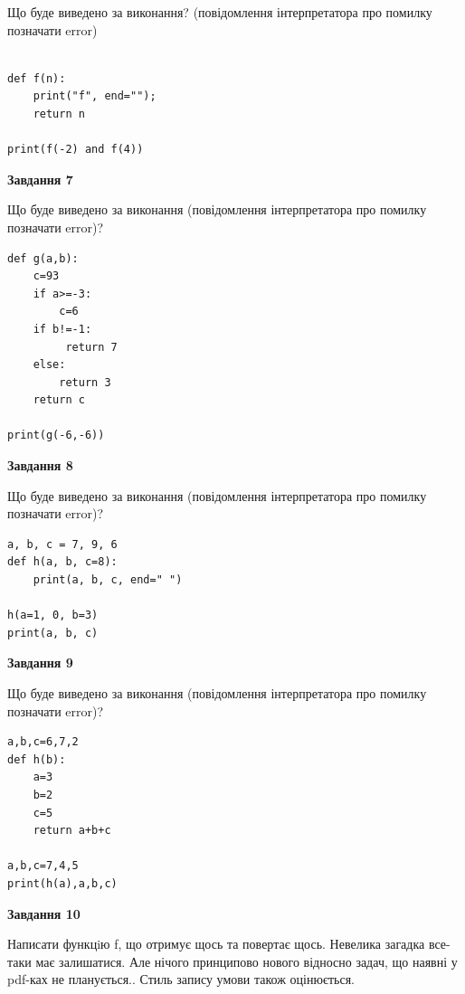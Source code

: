 \documentclass[12pt, ukrainian]{article}
\begin{document}
{\begin {large}
Що буде виведено за виконання? (повідомлення інтерпретатора про помилку позначати error)\par
\begin{verbatim}

def f(n):
    print("f", end="");
    return n

print(f(-2) and f(4))
\end{verbatim}

{\begin {center}\textbf{Завдання 7}\end {center}}

Що буде виведено за виконання (повідомлення інтерпретатора про помилку позначати error)?\par
\begin{verbatim}
def g(a,b):
    c=93
    if a>=-3:
        c=6
    if b!=-1:
         return 7
    else: 
        return 3
    return c

print(g(-6,-6))
\end{verbatim}

{\begin {center}\textbf{Завдання 8}\end {center}}

Що буде виведено за виконання (повідомлення інтерпретатора про помилку позначати error)?\par
\begin{verbatim}
a, b, c = 7, 9, 6
def h(a, b, c=8):
    print(a, b, c, end=" ")

h(a=1, 0, b=3)
print(a, b, c)
\end{verbatim}

{\begin {center}\textbf{Завдання 9}\end {center}}

Що буде виведено за виконання (повідомлення інтерпретатора про помилку позначати error)?\par
\begin{verbatim}
a,b,c=6,7,2
def h(b):
    a=3
    b=2
    c=5
    return a+b+c

a,b,c=7,4,5
print(h(a),a,b,c)
\end{verbatim}

{\begin {center}\textbf{Завдання 10}\end {center}}


Написати функцiю f, що отримує щось та повертає щось. Невелика загадка все-таки має залишатися. Але нічого принципово нового відносно задач, що наявні у pdf-ках не планується.. Стиль запису умови також оцінюється.\par
\end {large}}
\newpage
\end{document}

